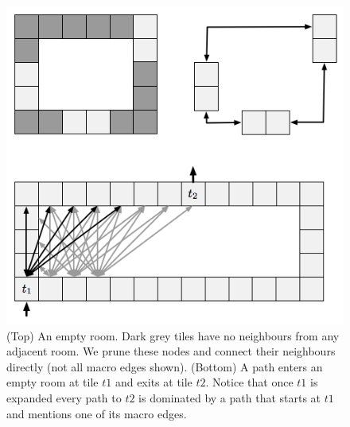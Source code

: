 \begin{figure}[t]
       \begin{center}
                       \includegraphics[scale=0.5, trim = 10mm 10mm 10mm 0mm]{diagrams/branching.png}
       \end{center}
	\vspace{-3pt}
       \caption{(Top) An empty room. Dark grey tiles have no neighbours from any adjacent room. 
We prune these nodes and connect their neighbours directly (not all macro edges shown).
		(Bottom) A path enters an empty room at tile $t1$ and exits at tile $t2$. Notice that once
$t1$ is expanded every path to $t2$ is dominated by a path that starts at $t1$ and mentions one of its macro edges.
}
       \label{fig-branching}
\end{figure}

